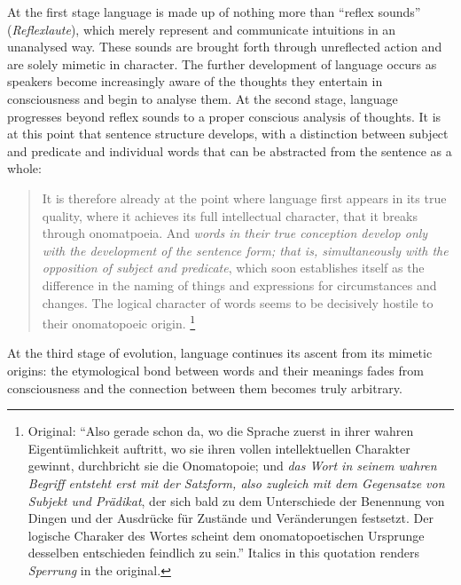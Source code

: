 \documentclass[output=paper]{langscibook}
\begin{document}
At the first stage language is made up of nothing more than ``reflex sounds'' (\emph{Reflexlaute}), which merely represent and communicate intuitions in an unanalysed way. These sounds are brought forth through unreflected action and are solely mimetic in character. The further development of language occurs as speakers become increasingly aware of the thoughts they entertain in consciousness and begin to analyse them. At the second stage, language progresses beyond reflex sounds to a proper conscious analysis of thoughts. It is at this point that sentence structure develops, with a distinction between subject and predicate and individual words that can be abstracted from the sentence as a whole:

\begin{quotation}
It is therefore already at the point where language first appears in its true quality, where it achieves its full intellectual character, that it breaks through onomatpoeia. And \emph{words in their true conception develop only with the development of the sentence form; that is, simultaneously with the opposition of subject and predicate}, which soon establishes itself as the difference in the naming of things and expressions for circumstances and changes. The logical character of words seems to be decisively hostile to their onomatopoeic origin. \citep[424--425]{Steinthal1881}\footnote{Original: ``Also gerade schon da, wo die Sprache zuerst in ihrer wahren Eigentümlichkeit auftritt, wo sie ihren vollen intellektuellen Charakter gewinnt, durchbricht sie die Onomatopoie; und \emph{das Wort in seinem wahren Begriff entsteht erst mit der Satzform, also zugleich mit dem Gegensatze von Subjekt und Prädikat}, der sich bald zu dem Unterschiede der Benennung von Dingen und der Ausdrücke für Zustände und Veränderungen festsetzt. Der logische Charaker des Wortes scheint dem onomatopoetischen Ursprunge desselben entschieden feindlich zu sein.'' Italics in this quotation renders \emph{Sperrung} in the original.}
\end{quotation}

At the third stage of evolution, language continues its ascent from its mimetic origins: the etymological bond between words and their meanings fades from consciousness and the connection between them becomes truly arbitrary.
\end{document}
